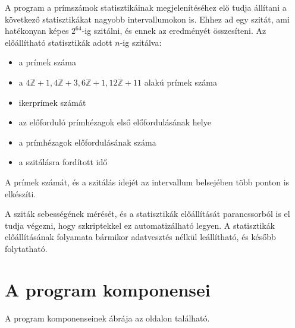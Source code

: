 A program a prímszámok statisztikáinak megjelenítéséhez elő tudja állítani a következő statisztikákat nagyobb intervallumokon is.
Ehhez ad egy szitát, ami hatékonyan képes $2^{64}$-ig szitálni, és ennek az eredményét összesíteni.
Az előállítható statisztikák adott $n$-ig szitálva:
\begin{itemize}
\item a prímek száma
\item a $4\mathbb{Z}+1, 4\mathbb{Z}+3, 6\mathbb{Z}+1, 12\mathbb{Z}+11$ alakú prímek száma
\item ikerprímek számát
\item az előforduló prímhézagok első előfordulásának helye
\item a prímhézagok előfordulásának száma
\item a szitálásra fordított idő
\end{itemize}

A prímek számát, és a szitálás idejét az intervallum belsejében több ponton is elkészíti.

A sziták sebességének mérését, és a statisztikák előállítását parancssorból is el tudja végezni, hogy szkriptekkel ez automatizálható legyen.
A statisztikák előállításának folyamata bármikor adatvesztés nélkül leállítható, és később folytatható.

\pagebreak
\section{A program komponensei}

A program komponenseinek ábrája az \pageref{komponensek} oldalon található.

